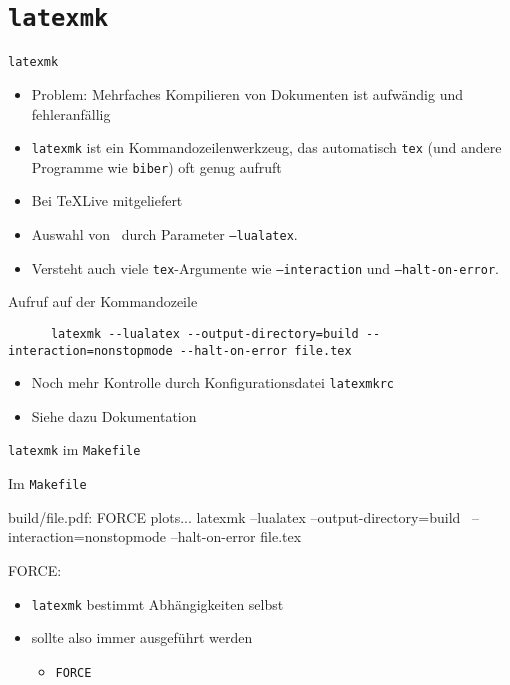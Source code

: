 \section{\texttt{latexmk}}

\begin{frame}[fragile]{
  \texttt{latexmk}
  \hfill
}
  \begin{itemize}
    \item Problem: Mehrfaches Kompilieren von Dokumenten ist aufwändig und fehleranfällig
    \item \texttt{latexmk} ist ein Kommandozeilenwerkzeug, das automatisch \texttt{tex} (und andere Programme wie \texttt{biber}) oft genug aufruft
    \item Bei TeXLive mitgeliefert
    \item Auswahl von \LuaLaTeX\ durch Parameter \texttt{--lualatex}.
    \item Versteht auch viele \texttt{tex}-Argumente wie \texttt{--interaction} und \texttt{--halt-on-error}.
  \end{itemize}

  \begin{block}{Aufruf auf der Kommandozeile}
    \begin{lstlisting}
      latexmk --lualatex --output-directory=build --interaction=nonstopmode --halt-on-error file.tex
    \end{lstlisting}
  \end{block}

  \begin{itemize}
    \item Noch mehr Kontrolle durch Konfigurationsdatei \texttt{latexmkrc}
    \item Siehe dazu Dokumentation
  \end{itemize}
\end{frame}

\begin{frame}[fragile]{\texttt{latexmk} im \texttt{Makefile}}
  \begin{block}{Im \texttt{Makefile}}
    \begin{lstmake}
      build/file.pdf: FORCE plots...
          latexmk --lualatex --output-directory=build \
              --interaction=nonstopmode --halt-on-error file.tex

      FORCE:
    \end{lstmake}
  \end{block}

  \begin{itemize}
    \item \texttt{latexmk} bestimmt Abhängigkeiten selbst
    \item sollte also immer ausgeführt werden
      \begin{itemize}
        \item \texttt{FORCE}
      \end{itemize}
  \end{itemize}
\end{frame}
